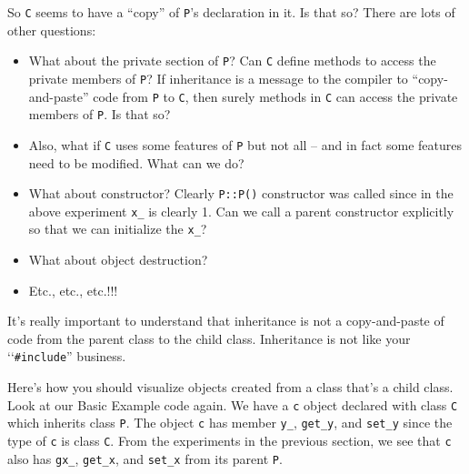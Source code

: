 


So \verb!C! seems to have a ``copy'' of \verb!P!'s
declaration in it. Is that so? There are lots of other questions:

\begin{itemize}
\item
  What about the private section of \verb!P!? Can \verb!C! define
  methods to access the private members of \verb!P!? If inheritance is a
  message to the compiler to ``copy-and-paste'' code from \verb!P! to
  \verb!C!, then surely methods in \verb!C! can access the private
  members of \verb!P!. Is that so?
\item
  Also, what if \verb!C! uses some features of \verb!P! but not all --
  and in fact some features need to be modified. What can we do?
\item
  What about constructor? Clearly \verb!P::P()! constructor was called
  since in the above experiment \verb!x_! is clearly 1. Can we call a
  parent constructor explicitly so that we can initialize the
  \verb!x_!?
\item
  What about object destruction?
\item
  Etc., etc., etc.!!!
\end{itemize}


\newpage{}

It's really important to understand that inheritance is not a copy-and-paste of code from the parent class to the child class. Inheritance is not like your \lq\lq \verb!#include!'' business.

Here's how you should visualize objects created from a class that's a child class. Look at our Basic Example code again. We have a \verb!c! object declared with class \verb!C! which inherits class \verb!P!. The object \verb!c! has member \verb!y_!, \verb!get_y!, and \verb!set_y! since the type of \verb!c! is class \verb!C!. From the experiments in the previous section, we see that \verb!c! also has \verb!gx_!, \verb!get_x!, and \verb!set_x! from its parent \verb!P!.

